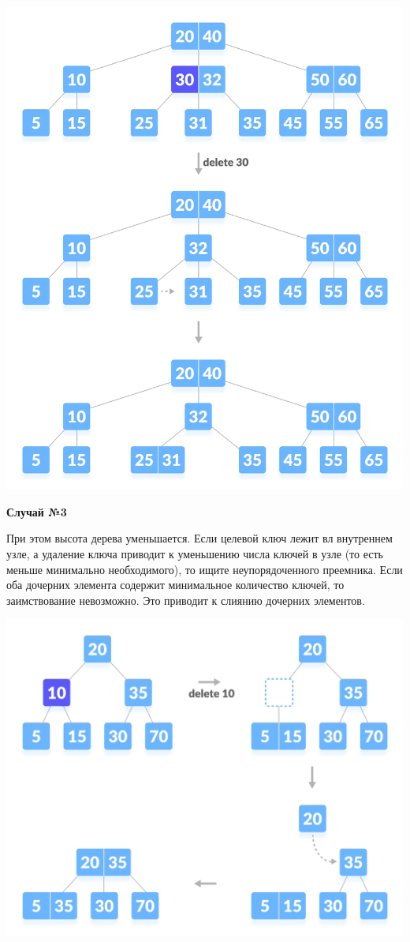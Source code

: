 \begin{enumerate}
\begin{center}
                \includegraphics[width=0.8\linewidth]{удал 5.jpg} \par
            \end{center}
            \newpage
        \end{enumerate}
        \textbf{Случай №3} \par
        При этом высота дерева уменьшается. Если целевой ключ лежит вл внутреннем узле, а удаление ключа приводит к уменьшению числа ключей в узле (то есть меньше минимально необходимого), то ищите неупорядоченного преемника. Если оба дочерних элемента содержит минимальное количество ключей, то заимствование невозможно. Это приводит к слиянию дочерних элементов. \par
        \begin{center}
                \includegraphics[width=1\linewidth]{удал п.jpg} \par
        \end{center}
